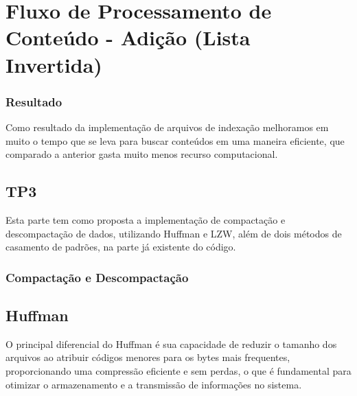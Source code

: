 \documentclass[12pt]{article}
\begin{document}
\section*{Fluxo de Processamento de Conteúdo - Adição (Lista Invertida)} 
\begin{center} 
\end{center}

\subsubsection{Resultado}
Como resultado da implementação de arquivos de indexação melhoramos em muito o tempo que se leva para buscar conteúdos em uma maneira eficiente, que comparado a anterior gasta muito menos recurso computacional.

\subsection{TP3}
Esta parte tem como proposta a implementação de compactação e descompactação de dados, utilizando Huffman e LZW, além de dois métodos de casamento de padrões, na parte já existente do código.

\subsubsection{Compactação e Descompactação}
\subsection*{Huffman}
O principal diferencial do Huffman é sua capacidade de reduzir o tamanho dos arquivos ao atribuir códigos menores para os bytes mais frequentes, proporcionando uma compressão eficiente e sem perdas, o que é fundamental para otimizar o armazenamento e a transmissão de informações no sistema.
\end{document}
